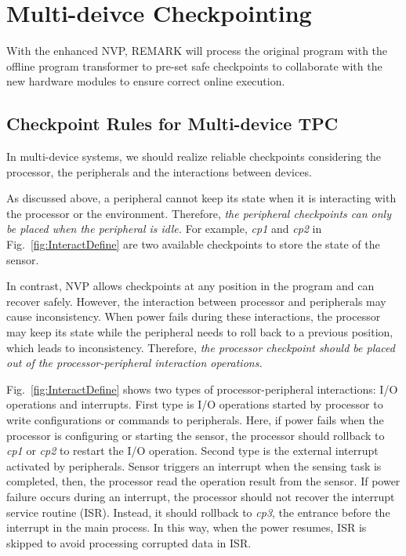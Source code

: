 \section{Multi-deivce Checkpointing} \label{sec:offline}
%
With the enhanced NVP, REMARK will process the original program with the offline program transformer to pre-set safe checkpoints to collaborate with the new hardware modules to ensure correct online execution.

\subsection{Checkpoint Rules for Multi-device TPC}\label{sec:offlineRules}
\vspace{-5pt}
%
In multi-device systems, we should realize reliable checkpoints considering the processor, the peripherals and the interactions between devices.

As discussed above, a peripheral cannot keep its state when it is interacting with the processor or the environment.
Therefore, \emph{the peripheral checkpoints can only be placed when the peripheral is idle.}
For example, \emph{cp1} and \emph{cp2} in Fig.~\ref{fig:InteractDefine} are two available checkpoints to store the state of the sensor.

In contrast, NVP allows checkpoints at any position in the program and can recover safely.
However, the interaction between processor and peripherals may cause inconsistency.
When power fails during these interactions, the processor may keep its state while the peripheral needs to roll back to a previous position, which leads to inconsistency.
Therefore, \emph{the processor checkpoint should be placed out of the processor-peripheral interaction operations.}

Fig.~\ref{fig:InteractDefine} shows two types of processor-peripheral interactions: I/O operations and interrupts.
First type is I/O operations started by processor to write configurations or commands to peripherals.
Here, if power fails when the processor is configuring or starting the sensor, the processor should rollback to \emph{cp1} or \emph{cp2} to restart the I/O operation.
Second type is the external interrupt activated by peripherals.
Sensor triggers an interrupt when the sensing task is completed, then, the processor read the operation result from the sensor.
If power failure occurs during an interrupt, the processor should not recover the interrupt service routine (ISR).
Instead, it should rollback to \emph{cp3}, the entrance before the interrupt in the main process.
In this way, when the power resumes, ISR is skipped to avoid processing corrupted data in ISR.

